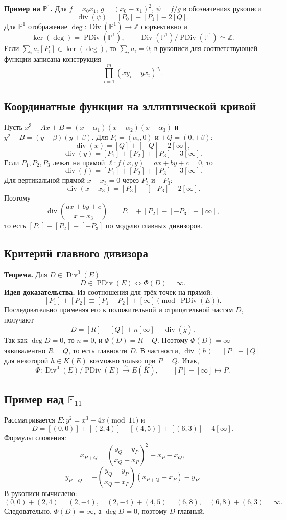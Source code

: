 \documentclass[12pt,a4paper]{article}
\newcommand{\Z}{\mathbb Z}\newcommand{\F}{\mathbb F}\newcommand{\Kbar}{\overline K}
\newcommand{\Div}{\operatorname{Div}}\newcommand{\PDiv}{\operatorname{PDiv}}\newcommand{\ord}{\operatorname{ord}}\newcommand{\Supp}{\operatorname{Supp}}
\begin{document}
\textbf{Пример на $\mathbb P^1$.} Для $f=x_0x_1$, $g=(x_0-x_1)^2$, $\psi=f/g$ в обозначениях рукописи
\[\operatorname{div}(\psi)=[P_0]-[P_1]-2[Q].\]
Для $\mathbb P^1$ отображение $\deg:\Div(\mathbb P^1)\to\Z$ сюръективно и
\[\ker(\deg)=\PDiv(\mathbb P^1),\qquad \Div(\mathbb P^1)/\PDiv(\mathbb P^1)\simeq\Z.\]
Если $\sum_i a_i[P_i]\in\ker(\deg)$, то $\sum_i a_i=0$; в рукописи для соответствующей функции записана конструкция
\[\prod_{i=1}^m(xy_i-yx_i)^{a_i}.\]

\subsection*{Координатные функции на эллиптической кривой}
Пусть $x^3+Ax+B=(x-\alpha_1)(x-\alpha_2)(x-\alpha_3)$ и $y^2-B=(y-\beta)(y+\beta)$. Для $P_i=(\alpha_i,0)$ и $\pm Q=(0,\pm\beta)$:
\[\operatorname{div}(x)=[Q]+[-Q]-2[\infty],\]
\[\operatorname{div}(y)=[P_1]+[P_2]+[P_3]-3[\infty].\]
Если $P_1,P_2,P_3$ лежат на прямой $\ell:f(x,y)=ax+by+c=0$, то
\[\operatorname{div}(f)=[P_1]+[P_2]+[P_3]-3[\infty].\]
Для вертикальной прямой $x-x_3=0$ через $P_3$ и $-P_3$:
\[\operatorname{div}(x-x_3)=[P_3]+[-P_3]-2[\infty].\]
Поэтому
\[\operatorname{div}\left(\frac{ax+by+c}{x-x_3}\right)=[P_1]+[P_2]-[-P_3]-[\infty],\]
то есть $[P_1]+[P_2]\equiv[-P_3]$ по модулю главных дивизоров.

\subsection*{Критерий главного дивизора}
\textbf{Теорема.} Для $D\in\Div^0(E)$
\[D\in\PDiv(E)\Longleftrightarrow\Phi(D)=\infty.\]
\textbf{Идея доказательства.} Из соотношения для трёх точек на прямой:
\[[P_1]+[P_2]\equiv[P_1+P_2]+[\infty]\pmod{\PDiv(E)}.\]
Последовательно применяя его к положительной и отрицательной частям $D$, получают
\[D=[R]-[Q]+n[\infty]+\operatorname{div}(\widetilde g).\]
Так как $\deg D=0$, то $n=0$, и $\Phi(D)=R-Q$. Поэтому $\Phi(D)=\infty$ эквивалентно $R=Q$, то есть главности $D$.
В частности, $\operatorname{div}(h)=[P]-[Q]$ для некоторой $h\in\Kbar(E)$ возможно только при $P=Q$.
Итак,
\[\Phi:\Div^0(E)/\PDiv(E)\xrightarrow{\sim}E(\Kbar),\qquad [P]-[\infty]\mapsto P.\]

\subsection*{Пример над $\F_{11}$}
Рассматривается $E:y^2=x^3+4x\pmod{11}$ и
\[D=[(0,0)]+[(2,4)]+[(4,5)]+[(6,3)]-4[\infty].\]
Формулы сложения:
\[x_{P+Q}=\left(\frac{y_Q-y_P}{x_Q-x_P}\right)^2-x_P-x_Q,\]
\[y_{P+Q}=-\left(\frac{y_Q-y_P}{x_Q-x_P}\right)(x_{P+Q}-x_P)-y_P.\]
В рукописи вычислено:
\[(0,0)+(2,4)=(2,-4),\quad (2,-4)+(4,5)=(6,8),\quad (6,8)+(6,3)=\infty.\]
Следовательно, $\Phi(D)=\infty$, а $\deg D=0$, поэтому $D$ главный.
\end{document}
